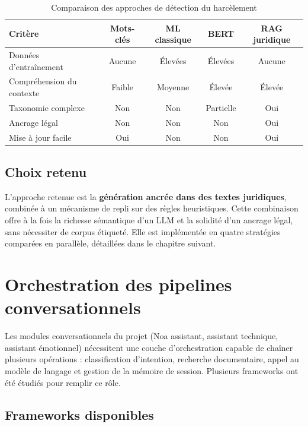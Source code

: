 \vspace{6pt}
\begin{table}[H]
\centering
\caption{Comparaison des approches de détection du harcèlement}
\label{tab:comparatif_classif}
\begin{tabular}{|l|c|c|c|c|}
\hline
\textbf{Critère} & \textbf{Mots-clés} & \textbf{ML classique} & \textbf{BERT} & \textbf{RAG juridique} \\
\hline
Données d'entraînement & Aucune & Élevées & Élevées & Aucune \\
Compréhension du contexte & Faible & Moyenne & Élevée & Élevée \\
Taxonomie complexe & Non & Non & Partielle & Oui \\
Ancrage légal & Non & Non & Non & Oui \\
Mise à jour facile & Oui & Non & Non & Oui \\
\hline
\end{tabular}
\end{table}

\subsection{Choix retenu}

L'approche retenue est la \textbf{génération ancrée dans des textes juridiques},
combinée à un mécanisme de repli sur des règles heuristiques.
Cette combinaison offre à la fois la richesse sémantique d'un LLM
et la solidité d'un ancrage légal, sans nécessiter de corpus étiqueté.
Elle est implémentée en quatre stratégies comparées en parallèle,
détaillées dans le chapitre suivant.

\section{Orchestration des pipelines conversationnels}

Les modules conversationnels du projet (Noa assistant, assistant technique, assistant émotionnel)
nécessitent une couche d'orchestration capable de chaîner plusieurs opérations :
classification d'intention, recherche documentaire, appel au modèle de langage
et gestion de la mémoire de session.
Plusieurs frameworks ont été étudiés pour remplir ce rôle.

\subsection{Frameworks disponibles}

